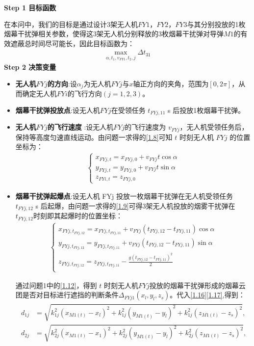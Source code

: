 \documentclass[../main.tex]{subfiles}
\begin{document}
\noindent \textbf{Step 1 目标函数}
\par 在本问中，我们的目标是通过设计3架无人机$FY1$，$FY2$，$FY3$与其分别投放的1枚烟幕干扰弹相关参数，使得这3架无人机分别释放的3枚烟幕干扰弹对导弹$M1$的有效遮蔽总时间尽可能长，因此目标函数为：
\begin{align}\label{19.1}
  \underset{\alpha ,t_1,v_{FY1},t_2,j}{\max}\Delta t_{31}
\end{align}
\noindent \textbf{Step 2 决策变量}

\begin{itemize}
\item \textbf{无人机$FYj$的方向}:设$\alpha_j$为无人机$FYj$与$x$轴正方向的夹角，范围为$\left[ 0,2\pi \right] $，从而确定无人机$FYi$的飞行方向$(j=1,2,3)$。
\item \textbf{烟幕干扰弹投放点}:设无人机$FYj$在受领任务 \( t_{FYj,11} \) s 后投放1枚烟幕干扰弹。
\item  \textbf{无人机$FYj$的飞行速度} :设无人机$FYj$的飞行速度为 \( v_{FYj} \)，无人机受领任务后，保持等高度匀速直线运动。由问题一求得的\eqref{1.8}可知 \( t \) 时刻无人机 \( FYj \) 的位置坐标为：
\begin{align}\label{19.3}
  \begin{cases}
x_{FYj,t} = x_{FYj,0} + v_{FYj} t \cos\alpha \\
y_{FYj,t} = y_{FYj,0} + v_{FYj} t \sin\alpha \\
z_{FYi,t} = z_{FYj,0}
\end{cases}
\end{align}
\item \textbf{烟幕干扰弹起爆点}:设无人机 FYj 投放一枚烟幕干扰弹在无人机受领任务 \( t_{FYj,12} \) s 后起爆，由问题一求得的\eqref{1.9}可得3架无人机投放的烟雾干扰弹在$t_{FYj,12}$时刻即其起爆时的位置坐标：
\begin{align}\label{19.4}
\left\{ \begin{array}{l}
	x_{FYj,t_{FYj,12}}=x_{FYj,t_{FYj,11}}+v_{FYj}\left( t_{FYj,12}-t_{FYj,11} \right) \cos \alpha\\
	y_{FYj,t_{FYj,12}}=y_{FYj,t_{FYj,11}}+v_{FYj}\left( t_{FYj,12}-t_{FYj,11} \right) \sin \alpha\\
	z_{FYj,t_{FYj,12}}=z_{FYj,t_{FYj,11}}-\frac{g\left( t_{FYj,12}-t_{FYj,11} \right) ^2}{2}\\
\end{array} \right. 
\end{align}
\par 通过问题1中的\eqref{1.12}，得到 $t$ 时刻无人机$FYj$投放的烟幕干扰弹形成的烟幕云团是否对目标进行遮挡的判断条件$\Delta _{FYj1}\left( x_l,y_l,z_s \right) $。代入\eqref{1.16}\eqref{1.17},得到：
\begin{align}\label{1.1713}
	\begin{aligned}
d_{1j} &= \sqrt{k_{1j}^2(x_{M1(t)} - x_l)^2 + k_{1j}^2(y_{M1(t)} - y_l)^2 + k_{1j}^2(z_{M1(t)} - z_s)^2}, \\
d_{2j} &= \sqrt{k_{2j}^2(x_{M1(t)} - x_1)^2 + k_{2j}^2(y_{M1(t)} - y_l)^2 + k_{2j}^2(z_{M1(t)} - z_s)^2},
\end{aligned}
\end{align}





\end{itemize}
\end{document}
